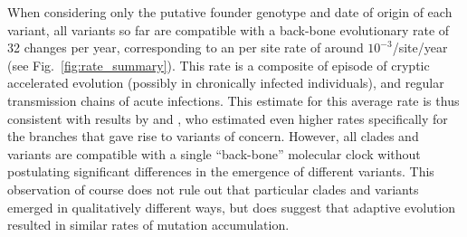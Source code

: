 \documentclass[aps,rmp, twocolumn]{revtex4}
\begin{document}
When considering only the putative founder genotype and date of origin of each variant, all variants so far are compatible with a back-bone evolutionary rate of 32 changes per year, corresponding to an per site rate of around $10^{-3}$/site/year (see Fig.~\ref{fig:rate_summary}).
This rate is a composite of episode of cryptic accelerated evolution (possibly in chronically infected individuals), and regular transmission chains of acute infections.
This estimate for this average rate is thus consistent with results by \citet{hill_origins_2022} and \citet{tay_emergence_2022}, who estimated even higher rates specifically for the branches that gave rise to variants of concern.
However, all clades and variants are compatible with a single ``back-bone'' molecular clock without postulating significant differences in the emergence of different variants.
This observation of course does not rule out that particular clades and variants emerged in qualitatively different ways, but does suggest that adaptive evolution resulted in similar rates of mutation accumulation.
\end{document}
